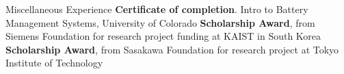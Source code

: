 \begin{rubric}{\faAward Miscellaneous Experience}
\entry*[2024] \textbf{Certificate of completion}. Intro to Battery Management Systems, University of Colorado
\entry*[2023] \textbf{Scholarship Award}, from Siemens Foundation for research project funding at KAIST in South Korea
%
\entry*[2020] \textbf{Scholarship Award}, from Sasakawa Foundation for research project at Tokyo Institute of Technology
%
%
\end{rubric}